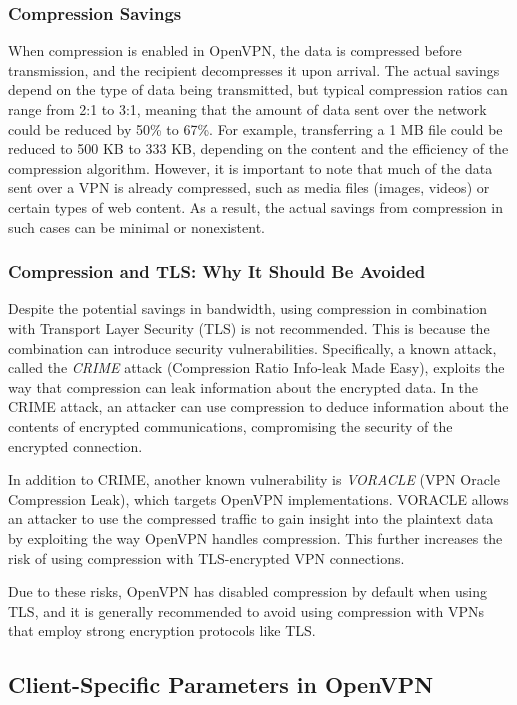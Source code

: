 \subsubsection{Compression Savings}

When compression is enabled in OpenVPN, the data is compressed before transmission, and the recipient decompresses it upon arrival. The actual savings depend on the type of data being transmitted, but typical compression ratios can range from 2:1 to 3:1, meaning that the amount of data sent over the network could be reduced by 50\% to 67\%. For example, transferring a 1 MB file could be reduced to 500 KB to 333 KB, depending on the content and the efficiency of the compression algorithm. However, it is important to note that much of the data sent over a VPN is already compressed, such as media files (images, videos) or certain types of web content. As a result, the actual savings from compression in such cases can be minimal or nonexistent.

\subsubsection{Compression and TLS: Why It Should Be Avoided}

Despite the potential savings in bandwidth, using compression in combination with Transport Layer Security (TLS) is not recommended. This is because the combination can introduce security vulnerabilities. Specifically, a known attack, called the \textit{CRIME} attack (Compression Ratio Info-leak Made Easy), exploits the way that compression can leak information about the encrypted data. In the CRIME attack, an attacker can use compression to deduce information about the contents of encrypted communications, compromising the security of the encrypted connection.

In addition to CRIME, another known vulnerability is \textit{VORACLE} (VPN Oracle Compression Leak), which targets OpenVPN implementations. VORACLE allows an attacker to use the compressed traffic to gain insight into the plaintext data by exploiting the way OpenVPN handles compression. This further increases the risk of using compression with TLS-encrypted VPN connections.

Due to these risks, OpenVPN has disabled compression by default when using TLS, and it is generally recommended to avoid using compression with VPNs that employ strong encryption protocols like TLS.

\subsection{Client-Specific Parameters in OpenVPN}

